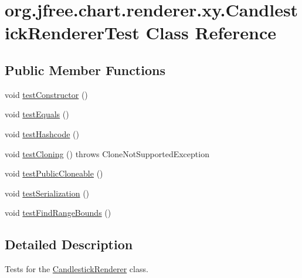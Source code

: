 \hypertarget{classorg_1_1jfree_1_1chart_1_1renderer_1_1xy_1_1_candlestick_renderer_test}{}\section{org.\+jfree.\+chart.\+renderer.\+xy.\+Candlestick\+Renderer\+Test Class Reference}
\label{classorg_1_1jfree_1_1chart_1_1renderer_1_1xy_1_1_candlestick_renderer_test}
\subsection*{Public Member Functions}
\begin{DoxyCompactItemize}
\item 
void \mbox{\hyperlink{classorg_1_1jfree_1_1chart_1_1renderer_1_1xy_1_1_candlestick_renderer_test_aa51f02f0efbaad82e9ca678ee90f1ff7}{test\+Constructor}} ()
\item 
void \mbox{\hyperlink{classorg_1_1jfree_1_1chart_1_1renderer_1_1xy_1_1_candlestick_renderer_test_a127ef5d0f26cad1a423555fe9823dee7}{test\+Equals}} ()
\item 
void \mbox{\hyperlink{classorg_1_1jfree_1_1chart_1_1renderer_1_1xy_1_1_candlestick_renderer_test_a3d339b580596f260a650e600fbf58acd}{test\+Hashcode}} ()
\item 
void \mbox{\hyperlink{classorg_1_1jfree_1_1chart_1_1renderer_1_1xy_1_1_candlestick_renderer_test_aa17df341d3298a8600a9be140d9e6ccb}{test\+Cloning}} ()  throws Clone\+Not\+Supported\+Exception 
\item 
void \mbox{\hyperlink{classorg_1_1jfree_1_1chart_1_1renderer_1_1xy_1_1_candlestick_renderer_test_a7dfb128cd8f2fb4dbf9195b32a323e03}{test\+Public\+Cloneable}} ()
\item 
void \mbox{\hyperlink{classorg_1_1jfree_1_1chart_1_1renderer_1_1xy_1_1_candlestick_renderer_test_ad2afc2d403234f0bf3d6d082fcf74b00}{test\+Serialization}} ()
\item 
void \mbox{\hyperlink{classorg_1_1jfree_1_1chart_1_1renderer_1_1xy_1_1_candlestick_renderer_test_a1bd61d77a8e16a6525778f262d73ea12}{test\+Find\+Range\+Bounds}} ()
\end{DoxyCompactItemize}


\subsection{Detailed Description}
Tests for the \mbox{\hyperlink{classorg_1_1jfree_1_1chart_1_1renderer_1_1xy_1_1_candlestick_renderer}{Candlestick\+Renderer}} class. 

